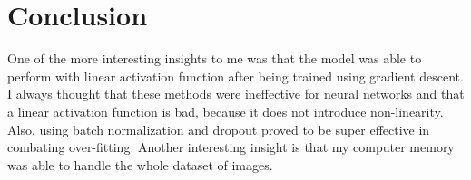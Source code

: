\documentclass{article}
\begin{document}
\section*{Conclusion}
One of the more interesting insights to me was that the model was able to perform with linear activation function after being trained using gradient descent. I always thought that these methods were ineffective for neural networks and that a linear activation function is bad, because it does not introduce non-linearity. Also, using batch normalization and dropout proved to be super effective in combating over-fitting. Another interesting insight is that my computer memory was able to handle the whole dataset of images.

    
\end{document}
